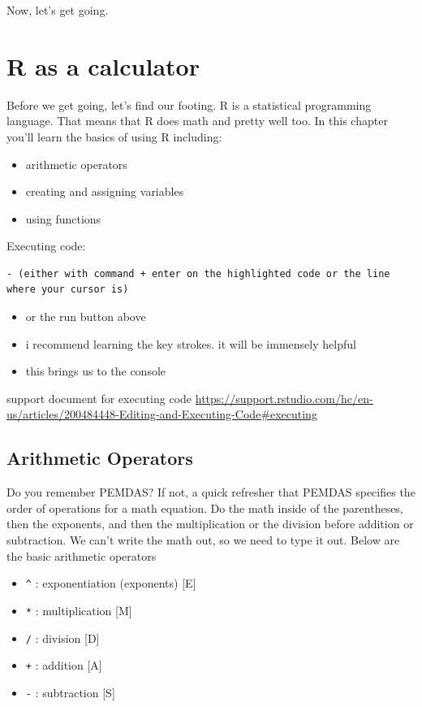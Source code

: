 \documentclass[
]{book}
\providecommand{\tightlist}{%
  \setlength{\itemsep}{0pt}\setlength{\parskip}{0pt}}
\begin{document}
Now, let's get going.

\hypertarget{r-as-a-calculator}{%
\chapter{R as a calculator}\label{r-as-a-calculator}}

Before we get going, let's find our footing. R is a statistical programming language. That means that R does math and pretty well too. In this chapter you'll learn the basics of using R including:

\begin{itemize}
\tightlist
\item
  arithmetic operators
\item
  creating and assigning variables
\item
  using functions
\end{itemize}

Executing code:

\begin{verbatim}
- (either with command + enter on the highlighted code or the line where your cursor is)
\end{verbatim}

\begin{itemize}
\tightlist
\item
  or the run button above
\item
  i recommend learning the key strokes. it will be immensely helpful
\item
  this brings us to the console
\end{itemize}

support document for executing code \url{https://support.rstudio.com/hc/en-us/articles/200484448-Editing-and-Executing-Code\#executing}

\hypertarget{arithmetic-operators}{%
\section{Arithmetic Operators}\label{arithmetic-operators}}

Do you remember PEMDAS? If not, a quick refresher that PEMDAS specifies the order of operations for a math equation. Do the math inside of the parentheses, then the exponents, and then the multiplication or the division before addition or subtraction. We can't write the math out, so we need to type it out. Below are the basic arithmetic operators

\begin{itemize}
\tightlist
\item
  \texttt{\^{}} : exponentiation (exponents) {[}E{]}
\item
  \texttt{*} : multiplication {[}M{]}
\item
  \texttt{/} : division {[}D{]}
\item
  \texttt{+} : addition {[}A{]}
\item
  \texttt{-} : subtraction {[}S{]}
\end{itemize}
\end{document}

